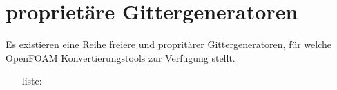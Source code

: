 \section{proprietäre Gittergeneratoren}

Es existieren eine Reihe freiere und propritärer Gittergeneratoren, für welche OpenFOAM Konvertierungstools zur Verfügung stellt.

\begin{itemize}
	\item[liste:]
\end{itemize}

\newpage